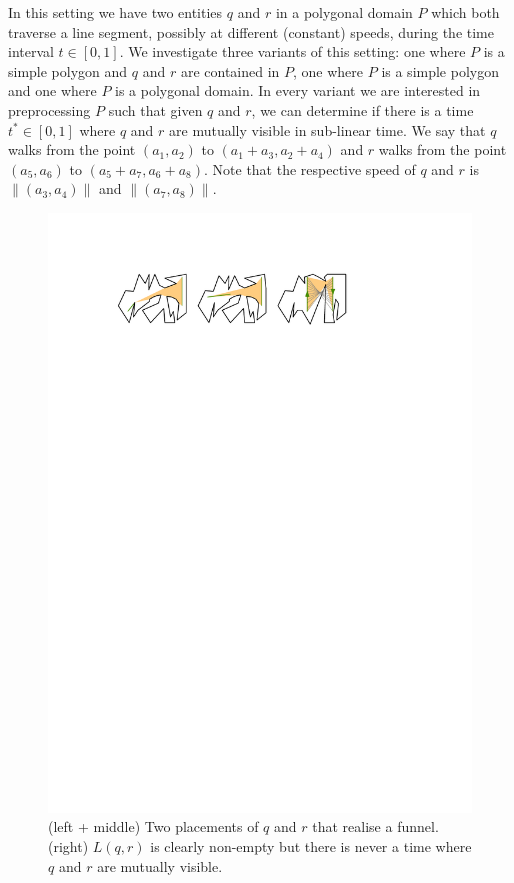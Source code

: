 \documentclass[a4paper, UKenglish]{lipics-v2018}
\begin{document}
In this setting we have two entities $q$ and $r$ in a polygonal domain $P$ which both traverse a line segment, possibly at different (constant) speeds, during the time interval $t \in [0,1]$. We investigate three variants of this setting: one where $P$ is a simple polygon and $q$ and $r$ are contained in $P$, one where $P$ is a simple polygon and one where $P$ is a polygonal domain. In every variant we are interested in preprocessing $P$ such that given $q$ and $r$, we can determine if there is a time $t^* \in [0,1]$ where $q$ and $r$ are mutually visible in sub-linear time. We say that $q$ walks from the point $(a_1, a_2)$ to $(a_1 + a_3, a_2 + a_4)$ and $r$ walks from the point $(a_5, a_6)$ to $(a_5 + a_7, a_6 + a_8)$. Note that the respective speed of $q$ and $r$ is $\lVert (a_3, a_4) \rVert$ and $\lVert (a_7, a_8) \rVert$.
%
\begin{figure}[h]
    \centering
    \setlength{\belowcaptionskip}{-20pt}
    \includegraphics[]{../edgecase}
    \caption{(left + middle) Two placements of $q$ and $r$ that realise a funnel. (right) $L(q,r)$ is clearly non-empty but there is never a time where $q$ and $r$ are mutually visible. }
    \label{fig:edgecase}
\end{figure}
\end{document}
